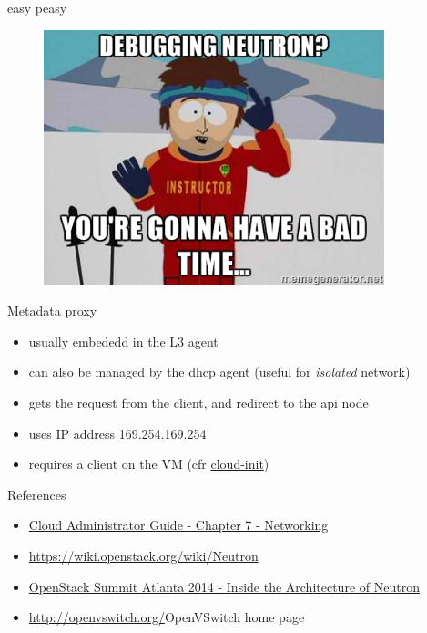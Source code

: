 \documentclass[english,serif,mathserif,xcolor=pdftex,dvipsnames,table]{beamer}
\begin{document}
\begin{frame}
  {easy peasy}
  \begin{figure}[ht]
    \centering
    \includegraphics[height=20em]{badtime.jpg}
  \end{figure}
\end{frame}

\begin{frame}
  {Metadata proxy}

  \begin{itemize}
  \item usually embededd in the L3 agent

  \item can also be managed by the dhcp agent (useful for \textit{isolated} network)

  \item gets the request from the client, and redirect to the api node

  \item uses IP address 169.254.169.254
  \item requires a client on the VM (cfr \href{https://launchpad.net/cloud-init}{cloud-init})

  \end{itemize}
\end{frame}

\begin{frame}
  {References}
  \begin{itemize}
  \item \href{http://docs.openstack.org/admin-guide-cloud/content/ch_networking.html}{Cloud
      Administrator Guide - Chapter 7 - Networking}
  \item \url{https://wiki.openstack.org/wiki/Neutron}
  \item \href{http://www.confreaks.com/videos/3533-openstacksummitatl2014-inside-the-architecture-of-neutron}{OpenStack
      Summit Atlanta 2014 - Inside the Architecture of Neutron}
  \item \url{http://openvswitch.org/}{OpenVSwitch home page}
  \end{itemize}
\end{frame}
\end{document}
